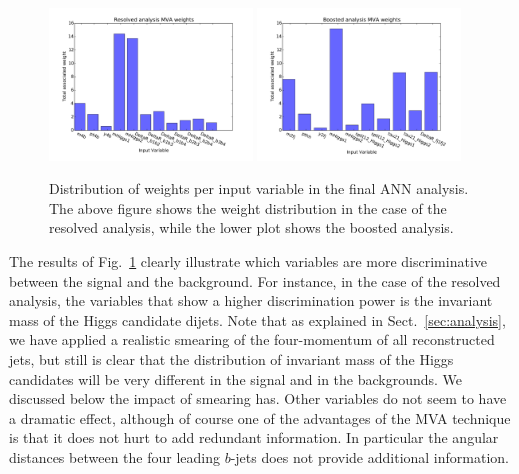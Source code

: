\begin{figure}[t]
\begin{center}
\includegraphics[width=0.48\textwidth]{plots/nnweights_res.pdf}
\includegraphics[width=0.48\textwidth]{plots/nnweights_boost.pdf}
\caption{\small Distribution of weights per input variable in the final ANN analysis. The above figure shows the weight distribution in the case of the resolved analysis, while the lower plot shows the boosted analysis.}
\label{fig:nnweights}
\end{center}
\end{figure}

The results of Fig.~\ref{fig:nnweights} clearly illustrate which variables
are more discriminative between the signal and the background.
%
For instance, in the case of the resolved analysis, the variables that show
a higher discrimination power is the invariant mass of the Higgs candidate dijets.
%
Note that as explained in Sect.~\ref{sec:analysis}, we have applied a realistic
smearing of the four-momentum of all reconstructed jets, but still is clear that the
distribution of invariant mass of the Higgs candidates will be very different
in the signal and in the backgrounds.
%
We discussed below the impact of smearing has.
%
Other variables do not seem to have a dramatic effect, although of course one of the
advantages of the MVA technique is that it does not hurt to add redundant
information.
%
In particular the angular distances between the four leading $b$-jets does not
provide additional information.


